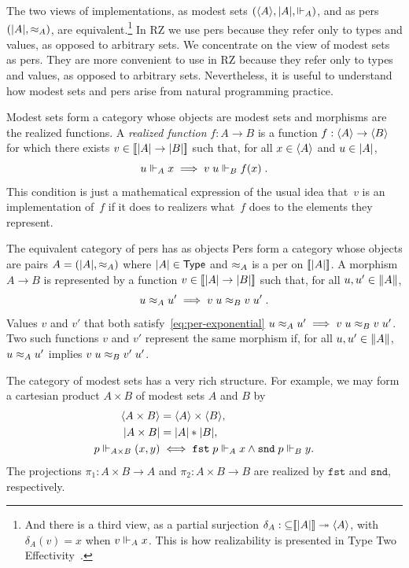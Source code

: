 The two views of implementations, as modest sets $(\langle A \rangle,
|A|, {\Vdash_A})$, and as pers $(|A|, {\approx_A})$, are
equivalent.\footnote{And there is a third view, as a partial surjection
  $\delta_A : {\subseteq}[\![|A|]\!] \twoheadrightarrow \langle A \rangle$, with
  $\delta_A(v) = x$ when $v \Vdash_A x$. This is how realizability is
  presented in Type Two Effectivity~\cite{Wei00}.} 
%
\iflong 
%
In RZ we use pers because they refer only to types and values,
as opposed to arbitrary sets.
%
\else
We concentrate on the view of modest sets as pers. They are more
convenient to use in RZ because they refer only to types and values,
as opposed to arbitrary sets.
\fi
%
Nevertheless, it is useful to understand
how modest sets and pers arise from natural programming practice.

\iflong
%
Modest sets form a category whose objects are modest sets and
morphisms are the realized functions. A \emph{realized function} $f :
A \to B$ is a function $f : \langle A \rangle \to \langle B \rangle$ for which there
exists $v \in [\![|A| \to |B|]\!]$ such that, for all
$x \in \langle A \rangle$ and $u \in |A|$,
%
\begin{equation}
  \label{eq:rz-function-space}
  u \Vdash_A x \implies v\;u \Vdash_B f(x) \;.
\end{equation}
%
This condition is just a mathematical expression of the usual idea
that~$v$ is an implementation of~$f$ if it does to realizers
what~$f$ does to the elements they represent.
\fi

\iflong
The equivalent category of pers has as objects
\else
Pers form a category whose objects are
\fi
%
pairs $A = (|A|, {\approx_A})$ where $|A| \in \mathsf{Type}$ and
$\approx_A$ is a per on $[\![|A|]\!]$. A morphism $A \to B$ is
represented by a function $v\in [\![|A| \to |B|]\!]$
such that, for all $u, u' \in \|A\|$,
%
\iflong
\begin{equation}
  \label{eq:per-exponential}
  u \approx_A u' \implies v\;u \approx_B v\;u' \;.
\end{equation}
%
Values $v$ and $v'$ that both satisfy~\eqref{eq:per-exponential}
\else %
$u \approx_A u' \implies v\;u \approx_B v\;u'$.  Two such functions $v$ and $v'$
\fi
represent the same morphism if, for all $u, u' \in \|A\|$,
$u \approx_A u'$ implies $v\;u \approx_B v'\;u'$.

\iflong
%
The category of modest sets has a very rich structure. For example, we
may form a cartesian product $A \times B$ of modest sets $A$ and $B$
by
%
\begin{align*}
  \langle A \times B \rangle &= \langle A \rangle \times \langle B \rangle,\\
  |A \times B| &= |A| * |B|,\\
  p \Vdash_{A \times B} (x,y) &\iff
  \mathtt{fst}\;p \Vdash_A x \land \mathtt{snd}\;p \Vdash_B y.
\end{align*}
%
The projections $\pi_1 : A \times B \to A$ and $\pi_2 : A \times B \to
B$ are realized by $\mathtt{fst}$ and $\mathtt{snd}$, respectively.

